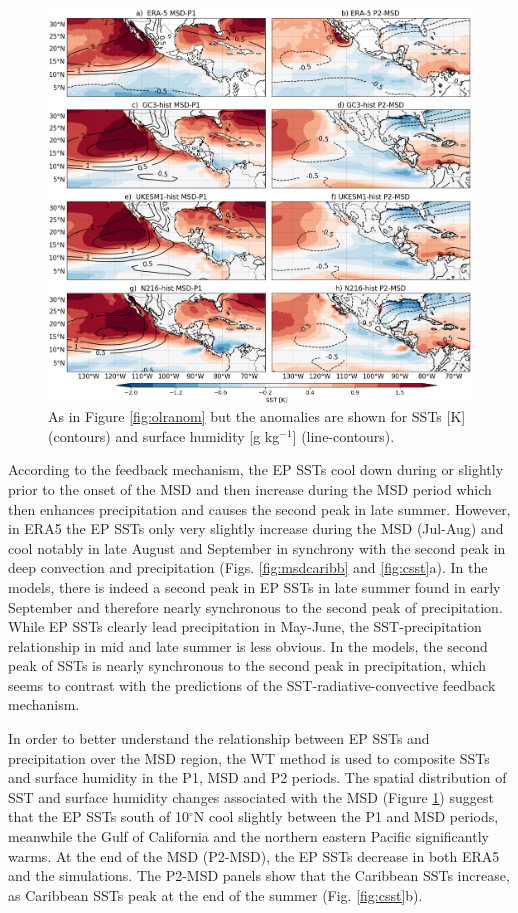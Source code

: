 \begin{figure}[b!]
\includegraphics[width=\linewidth]{figures/fig4_sstv_3.png}
\caption[Composite SST anomalies]{As in Figure \ref{fig:olranom} but the anomalies are shown for SSTs [K] (contours) and surface humidity [g kg$^{-1}$] (line-contours).  }
\label{fig:msdsstanom}
\end{figure}

According to the feedback mechanism, the EP SSTs cool down during or slightly prior to the onset of the MSD and then increase during the MSD period which then enhances precipitation and causes the second peak in late summer. However, in ERA5 the EP SSTs only very slightly increase during the MSD (Jul-Aug) and cool notably in late August and September in synchrony with the second peak in deep convection and precipitation (Figs. \ref{fig:msdcaribb} and \ref{fig:csst}a).
 In the models, there is indeed a second peak in EP SSTs in late summer found in early September and therefore nearly synchronous to the second peak of precipitation. While EP SSTs clearly lead precipitation in May-June, the SST-precipitation relationship in mid and late summer is less obvious. In the models, the second peak of SSTs is nearly synchronous to the second peak in precipitation, which seems to contrast with the predictions of the SST-radiative-convective feedback mechanism.
 
In order to better understand the relationship between EP SSTs and precipitation over the MSD region, the WT method is used to composite SSTs and surface humidity in the P1, MSD and P2 periods. 
The spatial distribution of SST and surface humidity changes associated with the MSD  (Figure \ref{fig:msdsstanom}) suggest that the EP SSTs south of 10$^\circ$N cool slightly between the P1 and  MSD periods, meanwhile the Gulf of California and the northern eastern Pacific significantly warms. At the end of the MSD (P2-MSD), the EP SSTs decrease in both ERA5 and the simulations. 
The P2-MSD panels show that the Caribbean SSTs increase, as Caribbean SSTs peak at the end of the summer (Fig. \ref{fig:csst}b).

